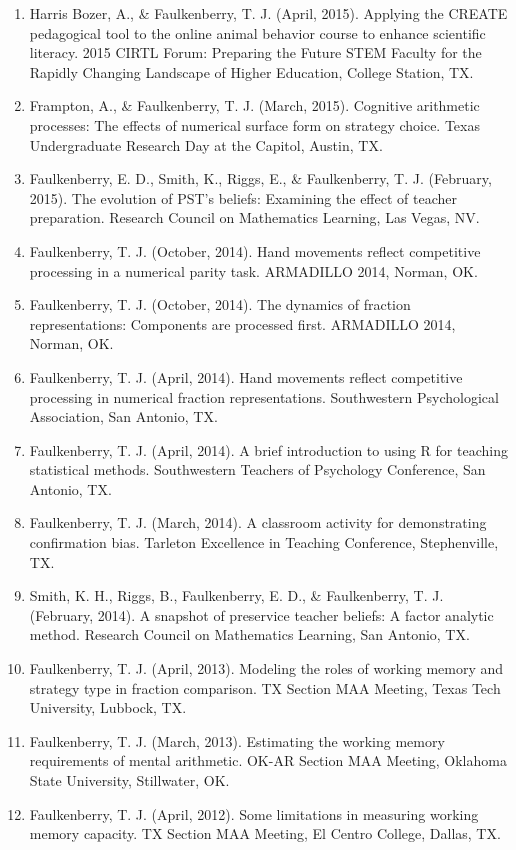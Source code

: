 \documentclass[article,10pt]{article}
\begin{document}
\begin{enumerate}
\item Harris Bozer, A., \& Faulkenberry, T. J. (April, 2015). Applying the CREATE pedagogical tool to the online animal behavior course to enhance scientific literacy.  2015 CIRTL Forum: Preparing the Future STEM Faculty for the Rapidly Changing Landscape of Higher Education, College Station, TX.
\item Frampton, A., \& Faulkenberry, T. J. (March, 2015). Cognitive arithmetic processes: The effects of numerical surface form on strategy choice. Texas Undergraduate Research Day at the Capitol, Austin, TX.
\item Faulkenberry, E. D., Smith, K., Riggs, E., \& Faulkenberry, T. J. (February, 2015). The evolution of PST’s beliefs: Examining the effect of teacher preparation. Research Council on Mathematics Learning, Las Vegas, NV.
\item Faulkenberry, T. J. (October, 2014).  Hand movements reflect competitive processing in a numerical parity task. ARMADILLO 2014, Norman, OK.
\item Faulkenberry, T. J. (October, 2014). The dynamics of fraction representations: Components are processed first. ARMADILLO 2014, Norman, OK.
\item Faulkenberry, T. J. (April, 2014). Hand movements reflect competitive processing in numerical fraction representations. Southwestern Psychological Association, San Antonio, TX.
\item Faulkenberry, T. J. (April, 2014). A brief introduction to using R for teaching statistical methods. Southwestern Teachers of Psychology Conference, San Antonio, TX.
\item Faulkenberry, T. J. (March, 2014). A classroom activity for demonstrating confirmation bias. Tarleton Excellence in Teaching Conference, Stephenville, TX.
\item Smith, K. H., Riggs, B., Faulkenberry, E. D., \& Faulkenberry, T. J. (February, 2014). A snapshot of preservice teacher beliefs: A factor analytic method. Research Council on Mathematics Learning, San Antonio, TX.
\item Faulkenberry, T. J. (April, 2013). Modeling the roles of working memory and strategy type in fraction comparison. TX Section MAA Meeting, Texas Tech University, Lubbock, TX.
\item Faulkenberry, T. J. (March, 2013). Estimating the working memory requirements of mental arithmetic. OK-AR Section MAA Meeting, Oklahoma State University, Stillwater, OK.
\item Faulkenberry, T. J. (April, 2012). Some limitations in measuring working memory capacity. TX Section MAA Meeting, El Centro College, Dallas, TX.

\end{enumerate}
\end{document}
